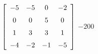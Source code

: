{$\left[ \begin {array}{cccc} -5&-5&0&-2\\\noalign{\medskip}0&0&5&0
\\\noalign{\medskip}1&3&3&1\\\noalign{\medskip}-4&-2&-1&-5\end {array} \right]$} 
{$-200$}



  

